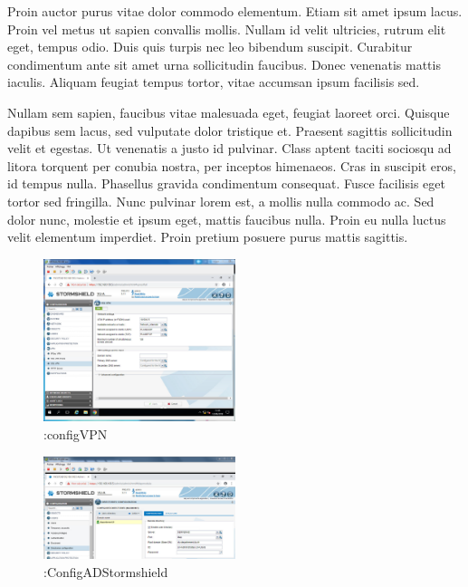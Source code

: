 \documentclass[a4paper,12pt]{report}
\begin{document}
Proin auctor purus vitae dolor commodo elementum. Etiam sit amet ipsum lacus. Proin vel metus ut sapien convallis mollis. Nullam id velit ultricies, rutrum elit eget, tempus odio. Duis quis turpis nec leo bibendum suscipit. Curabitur condimentum ante sit amet urna sollicitudin faucibus. Donec venenatis mattis iaculis. Aliquam feugiat tempus tortor, vitae accumsan ipsum facilisis sed.

Nullam sem sapien, faucibus vitae malesuada eget, feugiat laoreet orci. Quisque dapibus sem lacus, sed vulputate dolor tristique et. Praesent sagittis sollicitudin velit et egestas. Ut venenatis a justo id pulvinar. Class aptent taciti sociosqu ad litora torquent per conubia nostra, per inceptos himenaeos. Cras in suscipit eros, id tempus nulla. Phasellus gravida condimentum consequat. Fusce facilisis eget tortor sed fringilla. Nunc pulvinar lorem est, a mollis nulla commodo ac. Sed dolor nunc, molestie et ipsum eget, mattis faucibus nulla. Proin eu nulla luctus velit elementum imperdiet. Proin pretium posuere purus mattis sagittis.

\begin{figure}[H]

  \includegraphics[width=0.5\textwidth]{image/images/configVPN}
  \caption{:configVPN}
\end{figure}

\begin{figure}[H]

  \includegraphics[width=0.5\textwidth]{image/images/ConfigADStormshield}
  \caption{:ConfigADStormshield}
\end{figure}
\end{document}
